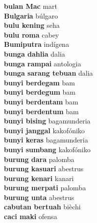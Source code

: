 \textbf{ bulan Mac  } mart \\
\textbf{ Bulgaria  } búlgaro \\
\textbf{ bulu kening  } seha \\
\textbf{ bulu roma  } cabey \\
\textbf{ Bumiputra  } indígena \\
\textbf{ bunga dahlia  } dalia \\
\textbf{ bunga rampai  } antologia \\
\textbf{ bunga sarang tebuan  } dalia \\
\textbf{ bunyi berdegam  } bam \\
\textbf{ bunyi berdegum  } bam \\
\textbf{ bunyi berdentam  } bam \\
\textbf{ bunyi berdentum  } bam \\
\textbf{ bunyi bising  } bagamunderia \\
\textbf{ bunyi janggal  } kakofóniko \\
\textbf{ bunyi keras  } bagamunderia \\
\textbf{ bunyi sumbang  } kakofóniko \\
\textbf{ burung dara  } palomba \\
\textbf{ burung kasuari  } abestrus \\
\textbf{ burung kenari  } kanari \\
\textbf{ burung merpati  } palomba \\
\textbf{ burung unta  } abestrus \\
\textbf{ cabutan bertuah  } bièchi \\
\textbf{ caci maki  } ofensa \\
